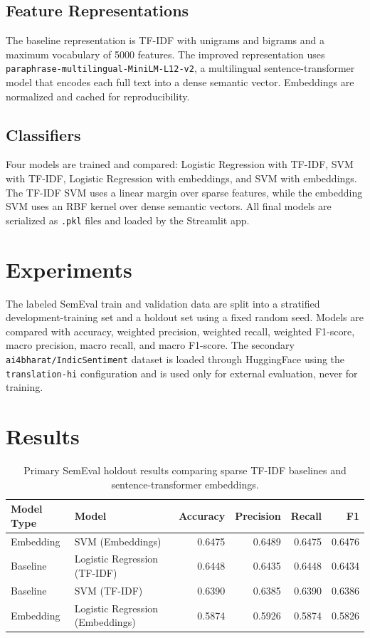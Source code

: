 \documentclass[11pt,a4paper]{article}
\begin{document}
\subsection{Feature Representations}
The baseline representation is TF-IDF with unigrams and bigrams and a maximum vocabulary of 5000 features. The improved representation uses \texttt{paraphrase-multilingual-MiniLM-L12-v2}, a multilingual sentence-transformer model that encodes each full text into a dense semantic vector. Embeddings are normalized and cached for reproducibility.

\subsection{Classifiers}
Four models are trained and compared: Logistic Regression with TF-IDF, SVM with TF-IDF, Logistic Regression with embeddings, and SVM with embeddings. The TF-IDF SVM uses a linear margin over sparse features, while the embedding SVM uses an RBF kernel over dense semantic vectors. All final models are serialized as \texttt{.pkl} files and loaded by the Streamlit app.

\section{Experiments}
The labeled SemEval train and validation data are split into a stratified development-training set and a holdout set using a fixed random seed. Models are compared with accuracy, weighted precision, weighted recall, weighted F1-score, macro precision, macro recall, and macro F1-score. The secondary \texttt{ai4bharat/IndicSentiment} dataset is loaded through HuggingFace using the \texttt{translation-hi} configuration and is used only for external evaluation, never for training.

\section{Results}
\begin{table}[htbp]
\centering
\caption{Primary SemEval holdout results comparing sparse TF-IDF baselines and sentence-transformer embeddings.}
\label{tab:primary-results}
\begin{tabular}{llrrrr}
\toprule
Model Type & Model & Accuracy & Precision & Recall & F1 \\
\midrule
Embedding & SVM (Embeddings) & 0.6475 & 0.6489 & 0.6475 & 0.6476 \\
Baseline & Logistic Regression (TF-IDF) & 0.6448 & 0.6435 & 0.6448 & 0.6434 \\
Baseline & SVM (TF-IDF) & 0.6390 & 0.6385 & 0.6390 & 0.6386 \\
Embedding & Logistic Regression (Embeddings) & 0.5874 & 0.5926 & 0.5874 & 0.5826 \\
\bottomrule
\end{tabular}
\end{table}
\end{document}
